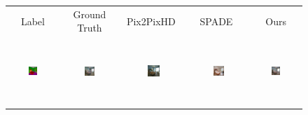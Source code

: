 \addtolength{\tabcolsep}{-4.5pt}    
\bgroup
\def\arraystretch{0.5}%
\begin{figure}[]
\begin{tabular} {cc|cc|c}
 Label & Ground Truth & Pix2PixHD~\cite{wang2018pix2pixHD} &  SPADE~\cite{park2019SPADE} & Ours\\


\includegraphics[width=0.1932\textwidth,height=0.96in]{Images/Rec/ADE/label/ADE_val_00000244.png} & \includegraphics[width=0.1932\textwidth,height=0.96in]{Images/Rec/ADE/gt/ADE_val_00000244.jpg} &
\includegraphics[width=0.1932\textwidth,height=0.96in]{Images/Rec/ADE/pix2pixhd/ADE_val_00000244.jpg} &   \includegraphics[width=0.1932\textwidth,height=0.96in]{Images/Rec/ADE/spade/ADE_val_00000244.jpg} &  \includegraphics[width=0.1932\textwidth,height=0.96in]{Images/Rec/ADE/ours/ADE_val_00000244.png} \\



\end{tabular}
\end{figure}
